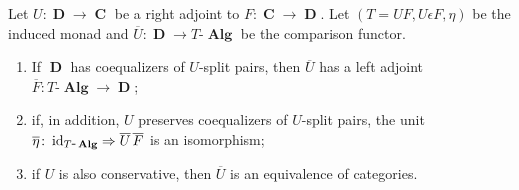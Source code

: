 \documentclass[a4paper,11pt,twoside, openany]{book}
\DeclareMathOperator{\Alg}{\mathbf{Alg}}
\DeclareMathOperator{\C}{\mathbf{C}}
\DeclareMathOperator{\D}{\mathbf{D}}
\DeclareMathOperator{\id}{id}
\theoremstyle{definition}
\theoremstyle{definition}
\theoremstyle{remark}
\begin{document}
	\begin{teo}[Beck]\label{Beck} Let $U\colon\D\to\C$ be a right adjoint to $F\colon\C\to\D$. Let $(T=UF, U\epsilon F, \eta)$ be the induced monad and $\overline{U}\colon\D\to T\mbox{-}\Alg$ be the comparison functor. 
		\begin{enumerate}
			\item If $\D$ has coequalizers of $U$-split pairs, then $\overline{U}$ has a left adjoint $\overline{F}\colon T\mbox{-}\Alg\to\D$;
			\item if, in addition, $U$ preserves coequalizers of $U$-split pairs, the unit $\overline{\eta}\colon\id_{T\mbox{-}\Alg}\Rightarrow\overline{U}\hspace{.5mm} \overline{F}$ is an isomorphism;
			\item if $U$ is also conservative, then $\overline{U}$ is an equivalence of categories.
		\end{enumerate}
	\end{teo}
\end{document}
